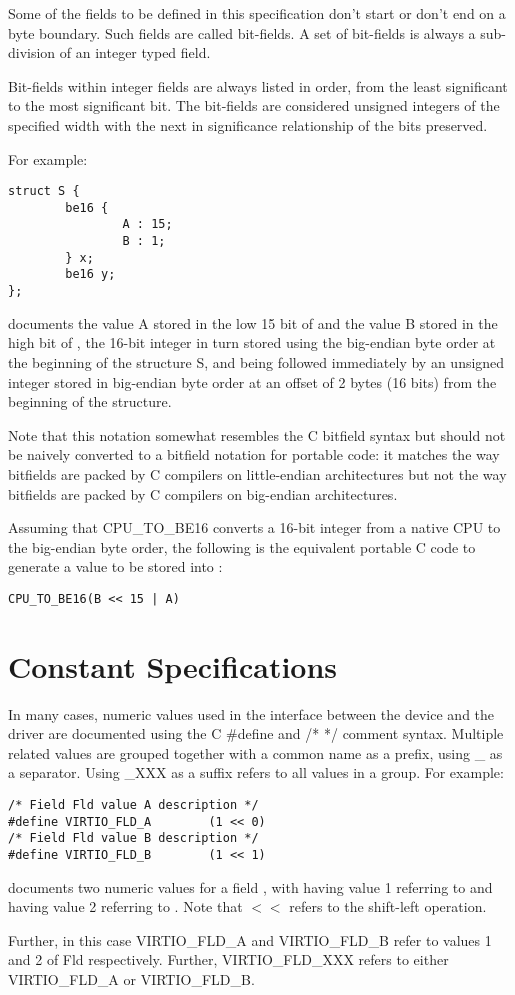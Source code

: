 Some of the fields to be defined in this specification don't
start or don't end on a byte boundary. Such fields are called bit-fields.
A set of bit-fields is always a sub-division of an integer typed field.

Bit-fields within integer fields are always listed in order,
from the least significant to the most significant bit.  The
bit-fields are considered unsigned integers of the specified
width with the next in significance relationship of the bits
preserved.

For example:
\begin{lstlisting}
struct S {
        be16 {
                A : 15;
                B : 1;
        } x;
        be16 y;
};
\end{lstlisting}
documents the value A stored in the low 15 bit of  and
the value B stored in the high bit of , the 16-bit
integer  in turn stored using the big-endian byte order
at the beginning of the structure S,
and being followed immediately by an unsigned integer 
stored in big-endian byte order at an offset of 2 bytes (16 bits)
from the beginning of the structure.

Note that this notation somewhat resembles the C bitfield syntax but
should not be naively converted to a bitfield notation for portable
code: it matches the way bitfields are packed by C compilers on
little-endian architectures but not the way bitfields are packed by C
compilers on big-endian architectures.

Assuming that CPU_TO_BE16 converts a 16-bit integer from a native
CPU to the big-endian byte order, the following is the equivalent
portable C code to generate a value to be stored into :
\begin{lstlisting}
CPU_TO_BE16(B << 15 | A)
\end{lstlisting}
\section{Constant Specifications}\label{sec:Constant Specifications}

In many cases, numeric values used in the interface between the device
and the driver are documented using the C \#define and /* */
comment syntax. Multiple related values are grouped together with
a common name as a prefix, using _ as a separator.
Using _XXX as a suffix refers to all values in a group.
For example:

\begin{lstlisting}
/* Field Fld value A description */
#define VIRTIO_FLD_A        (1 << 0)
/* Field Fld value B description */
#define VIRTIO_FLD_B        (1 << 1)
\end{lstlisting}
documents two numeric values for a field , with
 having value 1 referring to  and 
having value 2 referring to .
Note that $<<$ refers to the shift-left operation.

Further, in this case VIRTIO_FLD_A and VIRTIO_FLD_B
refer to values 1 and 2 of Fld respectively. Further, VIRTIO_FLD_XXX refers to
either VIRTIO_FLD_A or VIRTIO_FLD_B.

\newpage

